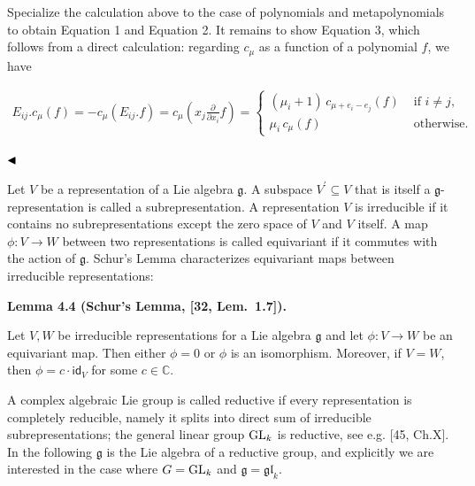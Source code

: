 Specialize the calculation above to the case of polynomials and metapolynomials to obtain Equation 1 and Equation 2. It remains to show Equation 3, which follows from a direct calculation: regarding $c_{\mu}$ as a function of a polynomial $f$, we have



\[\begin{aligned}
E_{ij}.c_{\mu}(f)=-c_{\mu}(E_{ij}.f)=c_{\mu}(x_{j}\frac{\partial}{\partial x_{i}}f)=\begin{cases}(\mu_{i}+1)\,c_{\mu+e_{i}-e_{j}}(f)&\text{ if }i\neq j,\\ \mu_{i}\,c_{\mu}(f)&\text{ otherwise}.\end{cases}\ 
\end{aligned}\]


$\hfill\blacktriangleleft$





Let $V$ be a representation of a Lie algebra $\mathfrak{g}$. A subspace $V^{\prime}\subseteq V$ that is itself a $\mathfrak{g}$-representation is called a subrepresentation. A representation $V$ is irreducible if it contains no subrepresentations except the zero space of $V$ and $V$ itself. A map $\phi:V\to W$ between two representations is called equivariant if it commutes with the action of $\mathfrak{g}$. Schur’s Lemma characterizes equivariant maps between irreducible representations:





\par\medskip\noindent\textbf{Lemma 4.4 (Schur’s Lemma, [32, Lem. 1.7]).}\par



Let $V,W$ be irreducible representations for a Lie algebra $\mathfrak{g}$ and let $\phi:V\to W$ be an equivariant map. Then either $\phi=0$ or $\phi$ is an isomorphism. Moreover, if $V=W$, then $\phi=c\cdot\mathsf{id}_{V}$ for some $c\in\mathbb{C}$.






A complex algebraic Lie group is called reductive if every representation is completely reducible, namely it splits into direct sum of irreducible subrepresentations; the general linear group $\textnormal{GL}_{k}$ is reductive, see e.g. [45, Ch.X]. In the following $\mathfrak{g}$ is the Lie algebra of a reductive group, and explicitly we are interested in the case where $G=\textnormal{GL}_{k}$ and $\mathfrak{g}=\mathfrak{gl}_{k}$.






